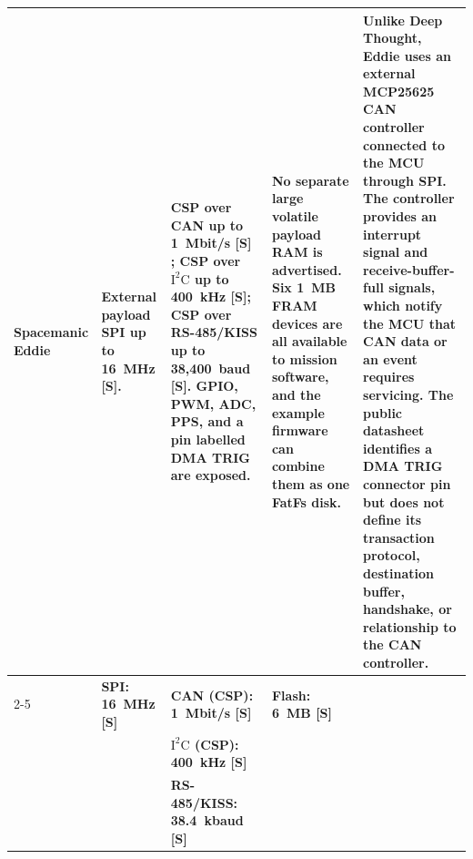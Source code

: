 \documentclass[10pt]{../datasheet}
\let\cite\citep
\begin{document}
\begin{landscape}
\begin{longtable}{|p{3.2cm}|p{4.5cm}|p{4.5cm}|p{4.5cm}|p{5.5cm}|}
    Spacemanic Eddie \cite{spacemanic_eddie_ds, libcsp_basics}         &
    External payload SPI up to 16~MHz [S].
                                                                       & CSP over CAN up to 1~Mbit/s [S] \cite{libcsp_basics}; CSP over
    $\text{I}^2\text{C}$ up to 400~kHz [S]; CSP over RS-485/KISS up to
    38,400~baud [S]. GPIO, PWM, ADC, PPS, and a pin labelled DMA TRIG are
    exposed.                                                           & No separate large
    volatile payload RAM is advertised. Six 1~MB FRAM devices are all available
    to mission software, and the example firmware can combine them as one FatFs
    disk.                                                              & Unlike Deep Thought, Eddie uses an external
    MCP25625 CAN controller connected to the MCU through SPI. The controller
    provides an interrupt signal and receive-buffer-full signals, which notify
    the MCU that CAN data or an event requires servicing. The public datasheet
    identifies a DMA TRIG connector pin but does not define its transaction
    protocol, destination buffer, handshake, or relationship to the CAN
    controller.
    \\
    \cline{2-5}
                                                                       & \textbf{SPI: 16~MHz [S]}
                                                                       & \textbf{CAN (CSP): 1~Mbit/s [S]}
                                                                       & \textbf{Flash: 6~MB [S]}                                                   &                                                                                                \\
                                                                       &                                                                            & \textbf{$\text{I}^2\text{C}$ (CSP): 400~kHz [S]} &                                           & \\
                                                                       &                                                                            & \textbf{RS-485/KISS: 38.4~kbaud [S]}             &                                           & \\ \hline\hline


\end{longtable}
\end{landscape}
\end{document}
